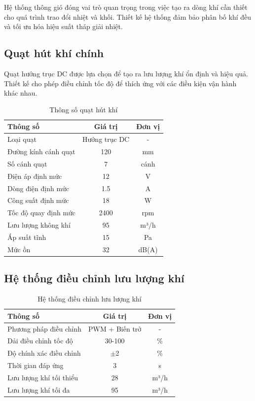 \documentclass[../main.tex]{subfiles}
\begin{document}
Hệ thống thông gió đóng vai trò quan trọng trong việc tạo ra dòng khí cần thiết cho quá trình trao đổi nhiệt và khối. Thiết kế hệ thống đảm bảo phân bố khí đều và tối ưu hóa hiệu suất tháp giải nhiệt.

\subsection{Quạt hút khí chính}
\label{sec:exhaust_fan}

Quạt hướng trục DC được lựa chọn để tạo ra lưu lượng khí ổn định và hiệu quả. Thiết kế cho phép điều chỉnh tốc độ để thích ứng với các điều kiện vận hành khác nhau.

\begin{table}[H]
\centering
\renewcommand{\arraystretch}{1.1}
\caption{Thông số quạt hút khí}
\label{tab:fan_specs}
\begin{tabular}{|l|c|c|}
\hline
\textbf{Thông số} & \textbf{Giá trị} & \textbf{Đơn vị} \\
\hline
Loại quạt & Hướng trục DC & - \\
\hline
Đường kính cánh quạt & 120 & mm \\
\hline
Số cánh quạt & 7 & cánh \\
\hline
Điện áp định mức & 12 & V \\
\hline
Dòng điện định mức & 1.5 & A \\
\hline
Công suất định mức & 18 & W \\
\hline
Tốc độ quay định mức & 2400 & rpm \\
\hline
Lưu lượng không khí & 95 & m³/h \\
\hline
Áp suất tĩnh & 15 & Pa \\
\hline
Mức ồn & 32 & dB(A) \\
\hline
\end{tabular}
\end{table}

\subsection{Hệ thống điều chỉnh lưu lượng khí}
\label{sec:airflow_control}

\begin{table}[H]
\centering
\renewcommand{\arraystretch}{1.1}
\caption{Hệ thống điều chỉnh lưu lượng khí}
\label{tab:airflow_control_specs}
\begin{tabular}{|l|c|c|}
\hline
\textbf{Thông số} & \textbf{Giá trị} & \textbf{Đơn vị} \\
\hline
Phương pháp điều chỉnh & PWM + Biến trở & - \\
\hline
Dải điều chỉnh tốc độ & 30-100 & \% \\
\hline
Độ chính xác điều chỉnh & $\pm$2 & \% \\
\hline
Thời gian đáp ứng & 3 & s \\
\hline
Lưu lượng khí tối thiểu & 28 & m³/h \\
\hline
Lưu lượng khí tối đa & 95 & m³/h \\
\hline
\end{tabular}
\end{table}
\end{document}
